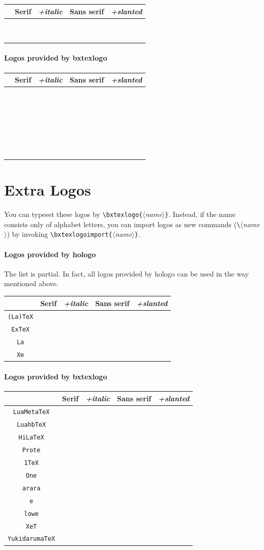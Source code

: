 \documentclass[a4paper]{article}
\newcommand{\Pkg}[1]{\textsf{#1}}
\newenvironment{LogoSamples}{%
  \begin{center}\begin{tabular}{ccccc}
    \hline \phantom{\LARGE I}
        & \textrm{Serif} & \textit{+italic}
        & \textsf{Sans serif} & \textsl{+slanted}
    \\\hline
}{%
    \hline
  \end{tabular}\end{center}
}
\newcommand*{\LSEntry}[1]{%
  \texttt{\string#1} & \textrm{#1} & \textit{#1}
      & \textsf{#1} & \textsf{\textsl{#1}}
  \\}
\newcommand*{\LSXEntry}[1]{%
  \texttt{#1} & \textrm{\bxtexlogo{#1}} & \textit{\bxtexlogo{#1}}
      & \textsf{\bxtexlogo{#1}} & \textsf{\textsl{\bxtexlogo{#1}}}
  \\}
\begin{document}
\begin{LogoSamples}
\LSEntry{\HanTheThanh}
\LSEntry{\KOMAScript}
\LSEntry{\LaTeXTeX}
\LSEntry{\NTS}
\LSEntry{\PiCTeX}
\LSEntry{\SageTeX}
\LSEntry{\SLiTeX}
\LSEntry{\teTeX}
\LSEntry{\TTH}
\end{LogoSamples}

\paragraph{Logos provided by \Pkg{bxtexlogo}}\mbox{}

\begin{LogoSamples}
\LSEntry{\ApTeX}
\LSEntry{\CSTUG}
\LSEntry{\DVIPDFMx}
\LSEntry{\HeVeA}
\LSEntry{\HiTeX}
\LSEntry{\JBibTeX}
\LSEntry{\JLaTeX}
\LSEntry{\JTeX}
\LSEntry{\KaTeX}
\LSEntry{\KET}
\LSEntry{\KETpic}
\LSEntry{\LaTeXiT}
\LSEntry{\LaTeXML}
\LSEntry{\logoAleph}
\LSEntry{\logoLambda}
\LSEntry{\logoLamed}
\LSEntry{\logoOmega}
\LSEntry{\OpTeX}
\LSEntry{\pTeXsT}
\LSEntry{\TeXXeT}
\LSEntry{\XyM}
\LSEntry{\XyMTeX}
\LSEntry{\BaSiX}
\LSEntry{\OneTeX}
\LSEntry{\SuyahTeX}
\LSEntry{\SATySFi}
\LSEntry{\TeXonLaTeX}
\end{LogoSamples}

\newpage
\section{Extra Logos}

You can typeset these logos by
\verb|\bxtexlogo{|$\langle$\emph{name}$\rangle$\verb|}|.
Instead, if the name consists only of alphabet letters,
you can import logos as new commands
(\verb|\|$\langle$\emph{name}$\rangle$)
by invoking
\verb|\bxtexlogoimport{|$\langle$\emph{name}$\rangle$\verb|}|.

\paragraph{Logos provided by \Pkg{hologo}}
The list is partial.
In fact, all logos provided by \Pkg{hologo} can be used
in the way mentioned above.

\begin{LogoSamples}
\LSXEntry{(La)TeX}
\LSXEntry{ExTeX}
\LSXEntry{La}
\LSXEntry{Xe}
\end{LogoSamples}

\paragraph{Logos provided by \Pkg{bxtexlogo}}\mbox{}

\begin{LogoSamples}
\LSXEntry{LuaMetaTeX}
\LSXEntry{LuahbTeX}
\LSXEntry{HiLaTeX}
\LSXEntry{Prote}
\LSXEntry{1TeX}
\LSXEntry{One}
\LSXEntry{arara}
\LSXEntry{e}
\LSXEntry{lowe}
\LSXEntry{XeT}
\LSXEntry{YukidarumaTeX}
\end{LogoSamples}
\end{document}
